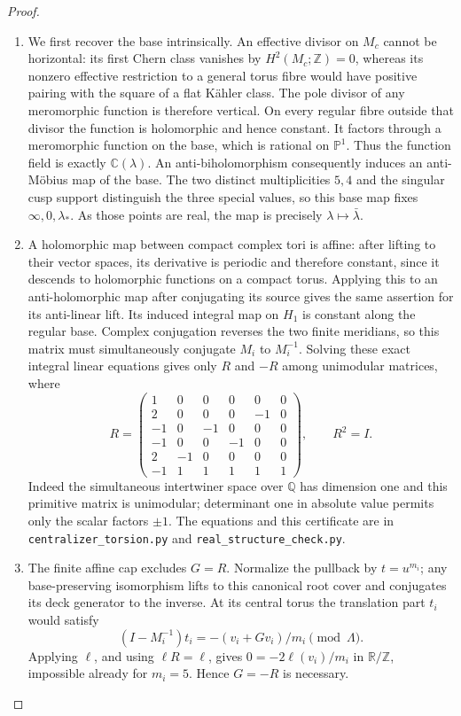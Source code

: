 \begin{proof}
\begin{enumerate}[label=\arabic*.]
\item We first recover the base intrinsically.  An effective divisor on
$M_c$ cannot be horizontal: its first Chern class vanishes by
$H^2(M_c;\mathbb Z)=0$, whereas its nonzero effective restriction to a
general torus fibre would have positive pairing with the square of a
flat K\"ahler class.  The pole divisor of any meromorphic function is
therefore vertical.  On every regular fibre outside that divisor the
function is holomorphic and hence constant.  It factors through a
meromorphic function on the base, which is rational on
$\mathbb P^1$.  Thus the function field is exactly $\mathbb C(\lambda)$.
An anti-biholomorphism consequently induces an anti-M\"obius map of
the base.  The two distinct multiplicities $5,4$ and the singular cusp
support distinguish the three special values, so this base map fixes
$\infty,0,\lambda_*$.  As those points are real, the map is precisely
$\lambda\mapsto\bar\lambda$.

\item A holomorphic map between compact complex tori is affine: after
lifting to their vector spaces, its derivative is periodic and
therefore constant, since it descends to holomorphic functions on a
compact torus.  Applying this to an anti-holomorphic map after
conjugating its source gives the same assertion for its anti-linear
lift.  Its induced integral map on $H_1$ is constant along the
regular base.  Complex conjugation reverses the two finite meridians,
so this matrix must simultaneously conjugate $M_i$ to $M_i^{-1}$.
Solving these exact integral linear equations gives only $R$ and
$-R$ among unimodular matrices, where
\[
R=\begin{pmatrix}
1&0&0&0&0&0\\
2&0&0&0&-1&0\\
-1&0&-1&0&0&0\\
-1&0&0&-1&0&0\\
2&-1&0&0&0&0\\
-1&1&1&1&1&1
\end{pmatrix},\qquad R^2=I.
\]
Indeed the simultaneous intertwiner space over $\mathbb Q$ has
dimension one and this primitive matrix is unimodular; determinant
one in absolute value permits only the scalar factors $\pm1$.
The equations and this certificate are in
\texttt{centralizer\_torsion.py} and
\texttt{real\_structure\_check.py}.

\item The finite affine cap excludes $G=R$.  Normalize the pullback by
$t=u^{m_i}$; any base-preserving isomorphism lifts to this canonical
root cover and conjugates its deck generator to the inverse.
At its central torus the translation part $t_i$ would satisfy
\[
(I-M_i^{-1})t_i=-(v_i+Gv_i)/m_i\pmod\Lambda.
\]
Applying $\ell$, and using $\ell R=\ell$, gives
$0=-2\ell(v_i)/m_i$ in $\mathbb R/\mathbb Z$, impossible already
for $m_i=5$.  Hence $G=-R$ is necessary.


\end{enumerate}
\end{proof}
